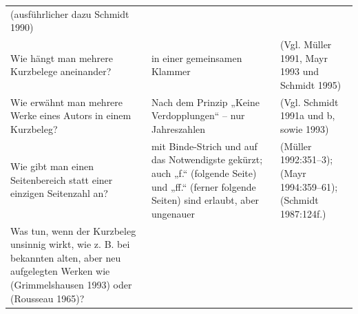 \documentclass[]{book}
\theoremstyle{definition}
\theoremstyle{definition}
\theoremstyle{definition}
\theoremstyle{remark}
\begin{document}
\begin{longtable}[]{@{}lll@{}}
\begin{minipage}[t]{0.32\columnwidth}
(ausführlicher dazu Schmidt 1990) \vspace{-6mm}\strut
\end{minipage}\tabularnewline
\begin{minipage}[t]{0.26\columnwidth}\raggedright\strut
Wie hängt man mehrere Kurzbelege aneinander?\strut
\end{minipage} & \begin{minipage}[t]{0.33\columnwidth}\raggedright\strut
in einer gemeinsamen Klammer\strut
\end{minipage} & \begin{minipage}[t]{0.32\columnwidth}\raggedright\strut
(Vgl. Müller 1991, Mayr 1993 und Schmidt 1995) \vspace{-6mm}\strut
\end{minipage}\tabularnewline
\begin{minipage}[t]{0.26\columnwidth}\raggedright\strut
Wie erwähnt man mehrere Werke eines Autors in einem Kurzbeleg?\strut
\end{minipage} & \begin{minipage}[t]{0.33\columnwidth}\raggedright\strut
Nach dem Prinzip „Keine Verdopplungen`` -- nur Jahreszahlen\strut
\end{minipage} & \begin{minipage}[t]{0.32\columnwidth}\raggedright\strut
(Vgl. Schmidt 1991a und b, sowie 1993) \vspace{-6mm}\strut
\end{minipage}\tabularnewline
\begin{minipage}[t]{0.26\columnwidth}\raggedright\strut
Wie gibt man einen Seitenbereich statt einer einzigen Seitenzahl
an?\strut
\end{minipage} & \begin{minipage}[t]{0.33\columnwidth}\raggedright\strut
mit Binde-Strich und auf das Notwendigste gekürzt; auch „f.`` (folgende
Seite) und „ff.`` (ferner folgende Seiten) sind erlaubt, aber
ungenauer\strut
\end{minipage} & \begin{minipage}[t]{0.32\columnwidth}\raggedright\strut
(Müller 1992:351--3); (Mayr 1994:359--61); (Schmidt 1987:124f.)
\vspace{-6mm}\strut
\end{minipage}\tabularnewline
\begin{minipage}[t]{0.26\columnwidth}\raggedright\strut
Was tun, wenn der Kurzbeleg unsinnig wirkt, wie z. B. bei bekannten
alten, aber neu aufgelegten Werken wie (Grimmelshausen 1993) oder
(Rousseau 1965)?\strut

\end{minipage}
\end{longtable}
\end{document}
